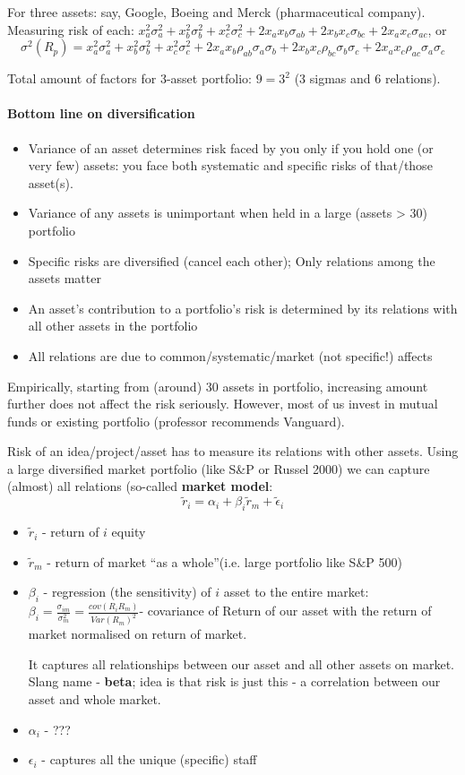 \documentclass{scrartcl}
\begin{document}
For three assets: say, Google, Boeing and Merck (pharmaceutical company).
Measuring risk of each: $x_a^2 \sigma_a^2 + x_b^2 \sigma_b^2 + x_c^2\sigma_c^2 +
2x_a x_b \sigma_{ab} + 2x_b x_c \sigma_{bc} + 2x_a x_c \sigma_{ac}$, or 
$$\sigma^2(R_p) = x_a^2 \sigma_a^2 + x_b^2 \sigma_b^2 + x_c^2\sigma_c^2 + 2x_a
x_b\rho_{ab} \sigma_a\sigma_b + 2x_b x_c \rho_{bc} \sigma_b\sigma_c + 2x_a x_c
\rho_{ac} \sigma_a\sigma_c$$ 

Total amount of factors for 3-asset portfolio: $9 = 3^2$ (3 sigmas and 6
relations). 

\paragraph{Bottom line on diversification}
\begin{itemize}
\item Variance of an asset determines risk faced by you only if you hold one (or
  very few) assets: you face both systematic and specific risks of that/those
  asset(s).
\item Variance of any assets is unimportant when held in a large (assets > 30)
  portfolio
\item Specific risks are diversified (cancel each other); Only relations among
  the assets matter
\item An asset's contribution to a portfolio's risk is determined by its
  relations with all other assets in the portfolio
\item All relations are due to common/systematic/market (not specific!) affects
\end{itemize}

Empirically, starting from (around) 30 assets in portfolio, increasing amount
further does not affect the risk seriously. However, most of us invest in mutual
funds or existing portfolio (professor recommends Vanguard). 

Risk of an idea/project/asset has to measure its relations with other assets.
Using a large diversified market portfolio (like S\&P or Russel 2000) we can
capture (almost) all relations (so-called {\bf market model}:
$$\tilde r_i = \alpha_i + \beta_i\tilde r_m + \tilde \epsilon_i$$
\begin{itemize}
\item $\tilde r_i$ - return of $i$ equity
\item $\tilde r_m$ - return of market ``as a whole''(i.e. large portfolio like
  S\&P 500) 
\item $\beta_i$ - regression (the sensitivity) of $i$ asset to the entire
  market: $\beta_i = \frac{\sigma_{im}}{\sigma^2_m} = \frac{cov(R_iR_m)}
  {Var(R_m)^2} $- covariance of Return of our asset with the return of market
  normalised on return of market. 

It captures all relationships between our asset and all other assets on market.
Slang name - {\bf beta}; idea is that risk is just this - a correlation between
our asset and whole market.
\item $\alpha_i$ - ???
\item $\epsilon_i$ - captures all the unique (specific) staff
\end{itemize}
\end{document}

